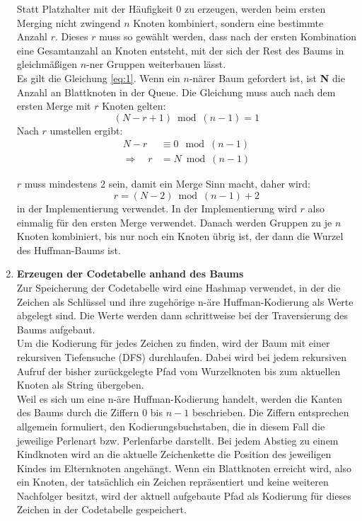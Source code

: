 \documentclass[a4paper,10pt,ngerman]{scrartcl}
\begin{document}
\begin{enumerate}
  Statt Platzhalter mit der Häufigkeit 0 zu erzeugen, werden beim ersten Merging nicht zwingend $n$ Knoten kombiniert, sondern eine bestimmte Anzahl $r$. Dieses $r$ muss so gewählt werden, dass nach der ersten Kombination eine Gesamtanzahl an Knoten entsteht, mit der sich der Rest des Baums in gleichmäßigen $n$-ner Gruppen weiterbauen lässt.\\
  \newline
  Es gilt die Gleichung \ref{eq:1}.
  \newline
  Wenn ein $n$-närer Baum gefordert ist, ist \textbf{N} die Anzahl an Blattknoten in der Queue. Die Gleichung muss auch nach dem ersten Merge mit $r$ Knoten gelten:
  \begin{equation*}
     (N-r+1) \bmod (n-1) = 1
  \end{equation*}
  Nach $r$ umstellen ergibt:
  \begin{align*}
    N - r &\equiv 0 \mod(n - 1) \\
    \Rightarrow \quad r &= N \bmod(n - 1) 
  \end{align*}

  $r$ muss mindestens 2 sein, damit ein Merge Sinn macht, daher wird:
  \begin{equation}
    r = (N - 2) \bmod (n - 1) + 2
    \label{eq:2}
  \end{equation}
  in der Implementierung verwendet.
  \newline
  In der Implementierung wird $r$ also einmalig für den ersten Merge verwendet. Danach werden Gruppen zu je $n$ Knoten kombiniert, bis nur noch ein Knoten übrig ist, der dann die Wurzel des Huffman-Baums ist.
  \item \textbf{Erzeugen der Codetabelle anhand des Baums} \\
  Zur Speicherung der Codetabelle wird eine Hashmap verwendet, in der die Zeichen als Schlüssel und ihre zugehörige n-äre Huffman-Kodierung als Werte abgelegt sind. Die Werte werden dann schrittweise bei der Traversierung des Baums aufgebaut. \\
  Um die Kodierung für jedes Zeichen zu finden, wird der Baum mit einer rekursiven Tiefensuche (DFS) durchlaufen. Dabei wird bei jedem rekursiven Aufruf der bisher zurückgelegte Pfad vom Wurzelknoten bis zum aktuellen Knoten als String übergeben.  \\
  \newline
  Weil es sich um eine n-äre Huffman-Kodierung handelt, werden die Kanten des Baums durch die Ziffern $0$ bis $n-1$ beschrieben. Die Ziffern entsprechen allgemein formuliert, den Kodierungsbuchstaben, die in diesem Fall die jeweilige Perlenart bzw. Perlenfarbe darstellt. Bei jedem Abstieg zu einem Kindknoten wird an die aktuelle Zeichenkette die Position des jeweiligen Kindes im Elternknoten angehängt. Wenn ein Blattknoten erreicht wird, also ein Knoten, der tatsächlich ein Zeichen repräsentiert und keine weiteren Nachfolger besitzt, wird der aktuell aufgebaute Pfad als Kodierung für dieses Zeichen in der Codetabelle gespeichert. 


\end{enumerate}
\end{document}
